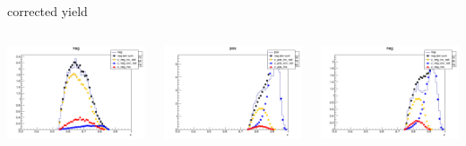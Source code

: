 \begin{frame}{corrected yield}
\begin{columns}
\begin{column}[T]{0.25\textwidth}
\includegraphics[width = \textwidth]{results/yield/statistics_corr/yield_x_Q2_z_0.60_5.500_0.65_neg.png}
\end{column}
\begin{column}[T]{0.25\textwidth}
\includegraphics[width = \textwidth]{results/yield/statistics_corr/yield_x_Q2_z_0.60_5.500_0.90_pos.png}
\end{column}
\begin{column}[T]{0.25\textwidth}
\includegraphics[width = \textwidth]{results/yield/statistics_corr/yield_x_Q2_z_0.60_5.500_0.90_neg.png}
\end{column}
\end{columns}
\end{frame}
